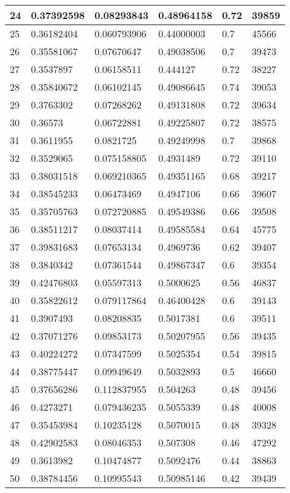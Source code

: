 \begin{longtable}{|l|l|l|l|l|l|}
24 & 0.37392598 & 0.08293843 & 0.48964158 & 0.72 & 39859 \\ \hline 
25 & 0.36182404 & 0.060793906 & 0.44000003 & 0.7 & 45566 \\ \hline 
26 & 0.35581067 & 0.07670647 & 0.49038506 & 0.7 & 39473 \\ \hline 
27 & 0.3537897 & 0.06158511 & 0.444127 & 0.72 & 38227 \\ \hline 
28 & 0.35840672 & 0.06102145 & 0.49086645 & 0.74 & 39053 \\ \hline 
29 & 0.3763302 & 0.07268262 & 0.49131808 & 0.72 & 39634 \\ \hline 
30 & 0.36573 & 0.06722881 & 0.49225807 & 0.72 & 38575 \\ \hline 
31 & 0.3611955 & 0.0821725 & 0.49249998 & 0.7 & 39868 \\ \hline 
32 & 0.3529065 & 0.075158805 & 0.4931489 & 0.72 & 39110 \\ \hline 
33 & 0.38031518 & 0.069210365 & 0.49351165 & 0.68 & 39217 \\ \hline 
34 & 0.38545233 & 0.06473469 & 0.4947106 & 0.66 & 39607 \\ \hline 
35 & 0.35705763 & 0.072720885 & 0.49549386 & 0.66 & 39508 \\ \hline 
36 & 0.38511217 & 0.08037414 & 0.49585584 & 0.64 & 45775 \\ \hline 
37 & 0.39831683 & 0.07653134 & 0.4969736 & 0.62 & 39407 \\ \hline 
38 & 0.3840342 & 0.07361544 & 0.49867347 & 0.6 & 39354 \\ \hline 
39 & 0.42476803 & 0.05597313 & 0.5000625 & 0.56 & 46837 \\ \hline 
40 & 0.35822612 & 0.079117864 & 0.46400428 & 0.6 & 39143 \\ \hline 
41 & 0.3907493 & 0.08208835 & 0.5017381 & 0.6 & 39511 \\ \hline 
42 & 0.37071276 & 0.09853173 & 0.50207955 & 0.56 & 39435 \\ \hline 
43 & 0.40224272 & 0.07347599 & 0.5025354 & 0.54 & 39815 \\ \hline 
44 & 0.38775447 & 0.09949649 & 0.5032893 & 0.5 & 46660 \\ \hline 
45 & 0.37656286 & 0.112837955 & 0.504263 & 0.48 & 39456 \\ \hline 
46 & 0.4273271 & 0.079436235 & 0.5055339 & 0.48 & 40008 \\ \hline 
47 & 0.35453984 & 0.10235128 & 0.5070015 & 0.48 & 39328 \\ \hline 
48 & 0.42902583 & 0.08046353 & 0.507308 & 0.46 & 47292 \\ \hline 
49 & 0.3613982 & 0.10474877 & 0.5092476 & 0.44 & 38863 \\ \hline 
50 & 0.38784456 & 0.10995543 & 0.50985146 & 0.42 & 39439 \\ \hline 
\end{longtable}
